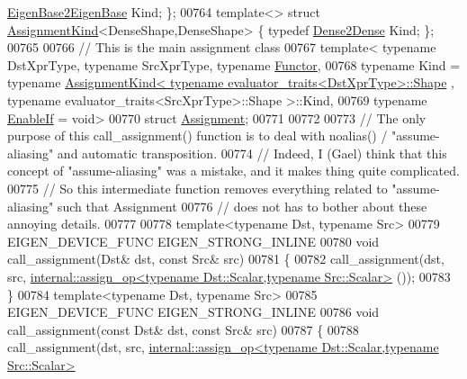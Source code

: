 \begin{DoxyCode}
      \hyperlink{struct_eigen_1_1internal_1_1_eigen_base2_eigen_base}{EigenBase2EigenBase} Kind; \};
00764 \textcolor{keyword}{template}<> \textcolor{keyword}{struct }\hyperlink{struct_eigen_1_1internal_1_1_assignment_kind}{AssignmentKind}<DenseShape,DenseShape> \{ \textcolor{keyword}{typedef} 
      \hyperlink{struct_eigen_1_1internal_1_1_dense2_dense}{Dense2Dense} Kind; \};
00765     
00766 \textcolor{comment}{// This is the main assignment class}
00767 \textcolor{keyword}{template}< \textcolor{keyword}{typename} DstXprType, \textcolor{keyword}{typename} SrcXprType, \textcolor{keyword}{typename} \hyperlink{struct_functor}{Functor},
00768           \textcolor{keyword}{typename} Kind = \textcolor{keyword}{typename} 
      \hyperlink{struct_eigen_1_1internal_1_1_assignment_kind}{AssignmentKind< typename evaluator\_traits<DstXprType>::Shape}
       , \textcolor{keyword}{typename} evaluator\_traits<SrcXprType>::Shape >::Kind,
00769           \textcolor{keyword}{typename} \hyperlink{struct_eigen_1_1internal_1_1_enable_if}{EnableIf} = \textcolor{keywordtype}{void}>
00770 \textcolor{keyword}{struct }\hyperlink{struct_eigen_1_1internal_1_1_assignment}{Assignment};
00771 
00772 
00773 \textcolor{comment}{// The only purpose of this call\_assignment() function is to deal with noalias() / "assume-aliasing" and
       automatic transposition.}
00774 \textcolor{comment}{// Indeed, I (Gael) think that this concept of "assume-aliasing" was a mistake, and it makes thing quite
       complicated.}
00775 \textcolor{comment}{// So this intermediate function removes everything related to "assume-aliasing" such that Assignment}
00776 \textcolor{comment}{// does not has to bother about these annoying details.}
00777 
00778 \textcolor{keyword}{template}<\textcolor{keyword}{typename} Dst, \textcolor{keyword}{typename} Src>
00779 EIGEN\_DEVICE\_FUNC EIGEN\_STRONG\_INLINE
00780 \textcolor{keywordtype}{void} call\_assignment(Dst& dst, \textcolor{keyword}{const} Src& src)
00781 \{
00782   call\_assignment(dst, src, 
      \hyperlink{struct_eigen_1_1internal_1_1assign__op}{internal::assign\_op<typename Dst::Scalar,typename Src::Scalar>}
      ());
00783 \}
00784 \textcolor{keyword}{template}<\textcolor{keyword}{typename} Dst, \textcolor{keyword}{typename} Src>
00785 EIGEN\_DEVICE\_FUNC EIGEN\_STRONG\_INLINE
00786 \textcolor{keywordtype}{void} call\_assignment(\textcolor{keyword}{const} Dst& dst, \textcolor{keyword}{const} Src& src)
00787 \{
00788   call\_assignment(dst, src, 
      \hyperlink{struct_eigen_1_1internal_1_1assign__op}{internal::assign\_op<typename Dst::Scalar,typename Src::Scalar>}

\end{DoxyCode}
